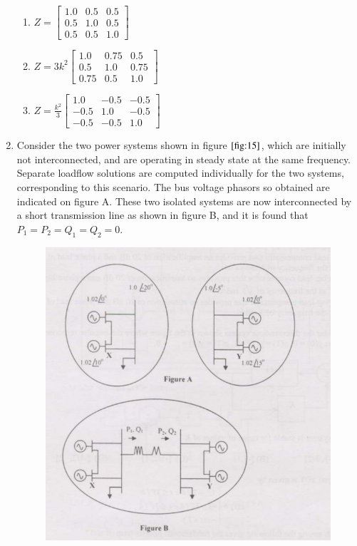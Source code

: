 \documentclass[journal]{IEEEtran}
\numberwithin{equation}{enumi}
\numberwithin{figure}{enumi}
\begin{document}
\begin{enumerate}
\begin{multicols}{2}
\begin{enumerate}
        \item $ Z = \begin{bmatrix} 1.0 & 0.5 & 0.5 \\ 0.5 & 1.0 & 0.5 \\ 0.5 & 0.5 & 1.0 \end{bmatrix} $
        \item $ Z = 3k^2 \begin{bmatrix} 1.0 & 0.75 & 0.5 \\ 0.5 & 1.0 & 0.75 \\ 0.75 & 0.5 & 1.0 \end{bmatrix} $
        \item $ Z = \frac{k^2}{3} \begin{bmatrix} 1.0 & -0.5 & -0.5 \\ -0.5 & 1.0 & -0.5 \\ -0.5 & -0.5 & 1.0 \end{bmatrix} $
    \end{enumerate}
    \end{multicols}
    \newpage
    \item Consider the two power systems shown in figure $\ref{fig:15}$, which are initially not interconnected, and are operating in steady state at the same frequency. Separate loadflow solutions are computed individually for the two systems, corresponding to this scenario. The bus voltage phasors so obtained are indicated on figure A. These two isolated systems are now interconnected by a short transmission line as shown in figure B, and it is found that $P_1 = P_2 = Q_1 = Q_2 = 0$.
    \begin{figure}[!ht]
    \centering
    \includegraphics[width=\linewidth]{figs/15.png}

\end{figure}
\end{enumerate}
\end{document}
